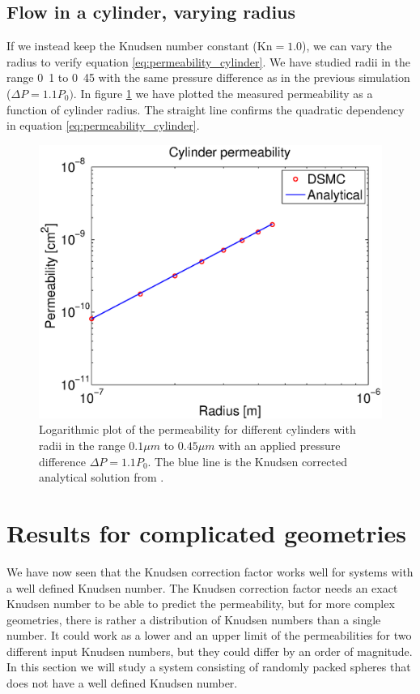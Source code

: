 \subsection{Flow in a cylinder, varying radius}
If we instead keep the Knudsen number constant ($\text{Kn}=1.0$), we can vary the radius to verify equation \eqref{eq:permeability_cylinder}. We have studied radii in the range \unit{0.1}{\micro\meter} to \unit{0.45}{\micro\meter} with the same pressure difference as in the previous simulation ($\Delta P = 1.1P_0)$. In figure \ref{fig:one_cylinder_varying_radii_result} we have plotted the measured permeability as a function of cylinder radius. The straight line confirms the quadratic dependency in equation \eqref{eq:permeability_cylinder}.
\begin{figure}[h]
\begin{center}
\includegraphics[width=\textwidth, trim=0cm 0cm 0cm 0cm, clip]{DSMC/figures/cylinder_radius_permeability.eps}
\end{center}
\caption{Logarithmic plot of the permeability for different cylinders with radii in the range $0.1 \mu m$ to $0.45 \mu m$ with an applied pressure difference $\Delta P = 1.1P_0$. The blue line is the Knudsen corrected analytical solution from \cite{karniadakis2005microflows}.}
\label{fig:one_cylinder_varying_radii_result}
\end{figure}
\section{Results for complicated geometries}
We have now seen that the Knudsen correction factor works well for systems with a well defined Knudsen number. The Knudsen correction factor needs an exact Knudsen number to be able to predict the permeability, but for more complex geometries, there is rather a distribution of Knudsen numbers than a single number. It could work as a lower and an upper limit of the permeabilities for two different input Knudsen numbers, but they could differ by an order of magnitude. In this section we will study a system consisting of randomly packed spheres that does not have a well defined Knudsen number.
